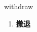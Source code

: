 
\begin{frame}
{\huge withdraw}
\begin{center}
\begin{enumerate}\Large
  \item \textbf{撤退}
\end{enumerate}
\end{center}
\end{frame}
